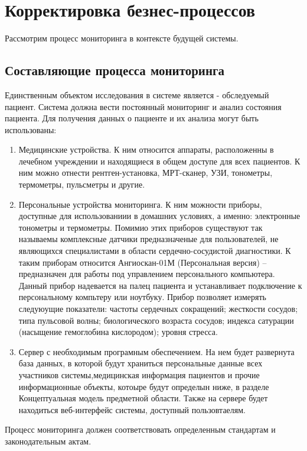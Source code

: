 \newpage
\section{Корректировка безнес-процессов}
Рассмотрим процесс мониторинга в контексте будущей системы.

\subsection{Составляющие процесса мониторинга}

Единственным объектом исследования в системе является - обследуемый пациент. Система должна вести постоянный мониторинг и анализ состояния пациента.
Для получения данных о пациенте и их анализа могут быть использованы:

\begin{enumerate}
  \item Медицинские устройства. К ним относится аппараты, расположенны в
  лечебном учреждении и находящиеся в общем доступе для всех пациентов. К ним можно отнести рентген-установка, МРТ-сканер, УЗИ, тонометры, термометры, пульсметры и другие.
  \item Персональные устройства мониторинга. К ним можности приборы, доступные
  для использованиии в домашних условиях, а именно: электронные тонометры и термометры. Помимио этих приборов существуют так называемы комплексные датчики предназначеные для пользователей, не являющихся специалистами в области сердечно-сосудистой диагностики. К таким приборам относится Ангиоскан-01М (Персональная версия) – предназначен для работы под управлением персонального компьютера. Данный прибор надевается на палец пациента и устанавливает подключение к персональному компьтеру или ноутбуку. Прибор позволяет измерять следуюущие показатели: частоты сердечных сокращений; жесткости сосудов; типа пульсовой волны; биологического возраста сосудов; индекса сатурации (насыщение гемоглобина кислородом); уровня стресса.
  \item Сервер с необходимым програмным обеспечением. На нем будет развернута
  база данных, в которой будут храниться персональные данные всех участников системы,медицинская информация пациентов и прочие информационные объекты, котоыре будут определын ниже,  в разделе Концептуальная модель предметной области. Также на сервере будет находиться веб-интерфейс системы, доступный пользовтаелям.
\end{enumerate}

Процесс мониторинга должен соответствовать определенным стандартам и законодательным актам.

